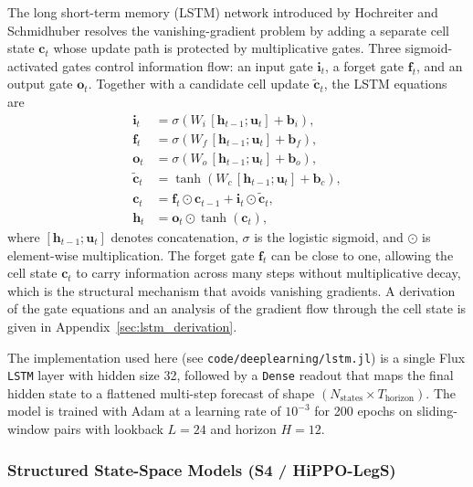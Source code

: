 The long short-term memory (LSTM) network introduced by Hochreiter and
Schmidhuber \cite{Hochreiter1997} resolves the vanishing-gradient problem by
adding a separate cell state $\mathbf{c}_t$ whose update path is protected by
multiplicative gates.  Three sigmoid-activated gates control information flow:
an input gate $\mathbf{i}_t$, a forget gate $\mathbf{f}_t$, and an output
gate $\mathbf{o}_t$.  Together with a candidate cell update
$\tilde{\mathbf{c}}_t$, the LSTM equations are
\begin{align}
  \mathbf{i}_t &= \sigma\!\left(W_i\,[\mathbf{h}_{t-1};\mathbf{u}_t] + \mathbf{b}_i\right),
                   \label{eq:lstm_i}\\
  \mathbf{f}_t &= \sigma\!\left(W_f\,[\mathbf{h}_{t-1};\mathbf{u}_t] + \mathbf{b}_f\right),
                   \label{eq:lstm_f}\\
  \mathbf{o}_t &= \sigma\!\left(W_o\,[\mathbf{h}_{t-1};\mathbf{u}_t] + \mathbf{b}_o\right),
                   \label{eq:lstm_o}\\
  \tilde{\mathbf{c}}_t &= \tanh\!\left(W_c\,[\mathbf{h}_{t-1};\mathbf{u}_t] + \mathbf{b}_c\right),
                   \label{eq:lstm_ctilde}\\
  \mathbf{c}_t &= \mathbf{f}_t \odot \mathbf{c}_{t-1} + \mathbf{i}_t \odot \tilde{\mathbf{c}}_t,
                   \label{eq:lstm_c}\\
  \mathbf{h}_t &= \mathbf{o}_t \odot \tanh(\mathbf{c}_t),
                   \label{eq:lstm_h}
\end{align}
where $[\mathbf{h}_{t-1};\mathbf{u}_t]$ denotes concatenation, $\sigma$ is the
logistic sigmoid, and $\odot$ is element-wise multiplication.  The forget gate
$\mathbf{f}_t$ can be close to one, allowing the cell state $\mathbf{c}_t$ to
carry information across many steps without multiplicative decay, which is the
structural mechanism that avoids vanishing gradients.  A derivation of the gate
equations and an analysis of the gradient flow through the cell state is given
in Appendix~\ref{sec:lstm_derivation}.

The implementation used here (see \texttt{code/deeplearning/lstm.jl}) is a
single Flux \texttt{LSTM} layer with hidden size 32, followed by a
\texttt{Dense} readout that maps the final hidden state to a flattened
multi-step forecast of shape $(N_{\mathrm{states}} \times T_{\mathrm{horizon}})$.
The model is trained with Adam at a learning rate of $10^{-3}$ for 200 epochs
on sliding-window pairs with lookback $L = 24$ and horizon $H = 12$.

\subsubsection{Structured State-Space Models (S4 / HiPPO-LegS)}
\label{sec:dl_s4}

